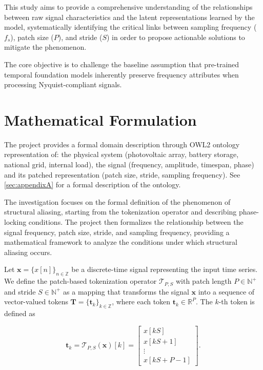 This study aims to provide a comprehensive understanding of the relationships between raw signal characteristics and the latent representations learned by the model, systematically identifying the critical links between sampling frequency ($f_s$), patch size ($P$), and stride ($S$) in order to propose actionable solutions to mitigate the phenomenon.

The core objective is to challenge the baseline assumption that pre-trained temporal foundation models inherently preserve frequency attributes when processing Nyquist-compliant signals.

\section{Mathematical Formulation}
The project provides a formal domain description through OWL2 ontology representation of: the physical system (photovoltaic array, battery storage, national grid, internal load), the signal (frequency, amplitude, timespan, phase) and its patched representation (patch size, stride, sampling frequency). See \autoref{sec:appendixA} for a formal description of the ontology.

The investigation focuses on the formal definition of the phenomenon of structural aliasing, starting from the tokenization operator and describing phase-locking conditions. The project then formalizes the relationship between the signal frequency, patch size, stride, and sampling frequency, providing a mathematical framework to analyze the conditions under which structural aliasing occurs. 

Let $\mathbf{x} = \{x[n]\}_{n \in \mathbb{Z}}$ be a discrete-time signal representing the input time series. We define the patch-based tokenization operator $\mathcal{T}_{P,S}$ with patch length $P \in \mathbb{N}^{+}$ and stride $S \in \mathbb{N}^{+}$ as a mapping that transforms the signal $\mathbf{x}$ into a sequence of vector-valued tokens $\mathbf{T}=\{\mathbf{t}_k\}_{k\in\mathbb{Z}}$, where each token $\mathbf{t}_k\in\mathbb{R}^{P}$. The $k$-th token is defined as

\begin{equation}
\label{eq:token_def}
\mathbf{t}_k
=
\mathcal{T}_{P,S}(\mathbf{x})[k]
=
\begin{bmatrix}
x[kS] \\
x[kS+1] \\
\vdots \\
x[kS+P-1]
\end{bmatrix}.
\end{equation}

